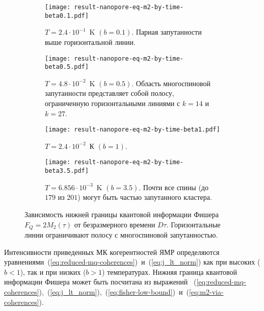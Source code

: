 \begin{figure}[H]
  \centering
  \begin{subfigure}[t]{0.4\textwidth}
    \texttt{[image: result-nanopore-eq-m2-by-time-beta0.1.pdf]}
    \caption{
      ${T=2.4\cdot10^{-1}}$~K $(b=0.1)$.
      Парная запутанности выше горизонтальной линии.
    }
    \label{fig:result-nanopore-eq-m2-by-time-beta0.1}
  \end{subfigure}
  \hfill
  \begin{subfigure}[t]{0.4\textwidth}
    \texttt{[image: result-nanopore-eq-m2-by-time-beta0.5.pdf]}
    \caption{
      ${T=4.8\cdot10^{-2}}$~K $(b=0.5)$.
      Область многоспиновой запутанности представляет собой полосу, ограниченную горизонтальными линиями с $k=14$ и $k=27$.
      }
    \label{fig:result-nanopore-eq-m2-by-time-beta0.5}
  \end{subfigure}
  \hfill
  \begin{subfigure}[t]{0.4\textwidth}
    \texttt{[image: result-nanopore-eq-m2-by-time-beta1.pdf]}
    \caption{
      ${T=2.4\cdot10^{-2}}$~К $(b=1)$.
    }
    \label{fig:result-nanopore-eq-m2-by-time-beta1}
  \end{subfigure}
  \hfill
  \begin{subfigure}[t]{0.4\textwidth}
    \texttt{[image: result-nanopore-eq-m2-by-time-beta3.5.pdf]}
    \caption{
      ${T=6.856\cdot10^{-3}}$~K $(b=3.5)$.
      Почти все спины (до $179$ из $201$) могут быть частью запутанного кластера.
    }
  \label{fig:result-nanopore-eq-m2-by-time-beta3.5}
  \end{subfigure}
  \caption{
    Зависимость нижней границы квантовой информации Фишера $F_Q = 2M_2(\tau)$ от безразмерного времени $D\tau$.
    Горизонтальные линии ограничивают полосу с многоспиновой запутанностью.
  }
\end{figure}

Интенсивности приведенных МК когерентностей  ЯМР определяются уравнениями~(\ref{eq:reduced-mq-coherences})~и~(\ref{eq:j_lt_norm}) как при высоких ($b < 1$), так и при низких ($b > 1$) температурах.
Нижняя граница квантовой информации Фишера может быть посчитана из выражений
~(\ref{eq:reduced-mq-coherences}),~(\ref{eq:j_lt_norm}),~(\ref{eq:fisher-low-bound})~и~(\ref{eq:m2-via-coherences}).

